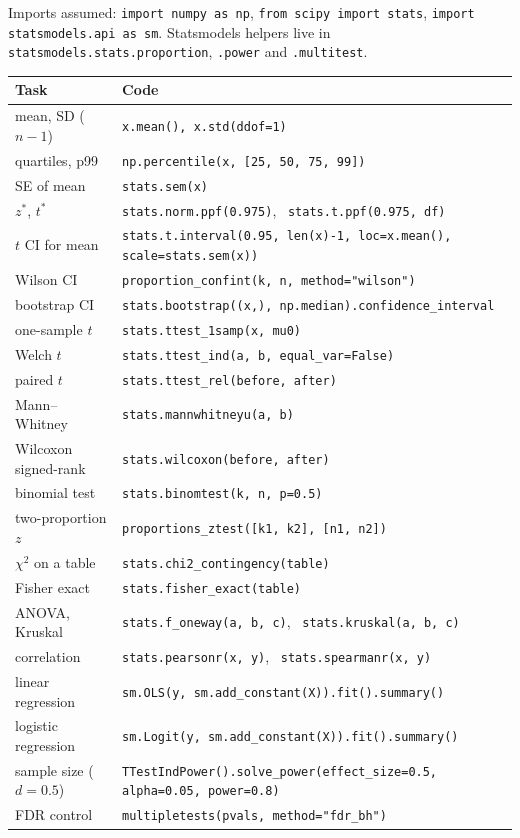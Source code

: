 Imports assumed: \texttt{import numpy as np}, \texttt{from scipy import stats}, \texttt{import statsmodels.api as sm}. Statsmodels helpers live in \texttt{statsmodels.stats.proportion}, \texttt{.power} and \texttt{.multitest}.

\begin{center}
\footnotesize
\renewcommand{\arraystretch}{1.2}
\begin{tabular}{@{}p{3.4cm}p{11.3cm}@{}}
\toprule
Task & Code \\
\midrule
mean, SD ($n-1$) & \texttt{x.mean(), x.std(ddof=1)} \\
quartiles, p99 & \texttt{np.percentile(x, [25, 50, 75, 99])} \\
SE of mean & \texttt{stats.sem(x)} \\
$z^*$, $t^*$ & \texttt{stats.norm.ppf(0.975)}, \ \texttt{stats.t.ppf(0.975, df)} \\
$t$ CI for mean & \texttt{stats.t.interval(0.95, len(x)-1, loc=x.mean(), scale=stats.sem(x))} \\
Wilson CI & \texttt{proportion\_confint(k, n, method="wilson")} \\
bootstrap CI & \texttt{stats.bootstrap((x,), np.median).confidence\_interval} \\
one-sample $t$ & \texttt{stats.ttest\_1samp(x, mu0)} \\
Welch $t$ & \texttt{stats.ttest\_ind(a, b, equal\_var=False)} \\
paired $t$ & \texttt{stats.ttest\_rel(before, after)} \\
Mann--Whitney & \texttt{stats.mannwhitneyu(a, b)} \\
Wilcoxon signed-rank & \texttt{stats.wilcoxon(before, after)} \\
binomial test & \texttt{stats.binomtest(k, n, p=0.5)} \\
two-proportion $z$ & \texttt{proportions\_ztest([k1, k2], [n1, n2])} \\
$\chi^2$ on a table & \texttt{stats.chi2\_contingency(table)} \\
Fisher exact & \texttt{stats.fisher\_exact(table)} \\
ANOVA, Kruskal & \texttt{stats.f\_oneway(a, b, c)}, \ \texttt{stats.kruskal(a, b, c)} \\
correlation & \texttt{stats.pearsonr(x, y)}, \ \texttt{stats.spearmanr(x, y)} \\
linear regression & \texttt{sm.OLS(y, sm.add\_constant(X)).fit().summary()} \\
logistic regression & \texttt{sm.Logit(y, sm.add\_constant(X)).fit().summary()} \\
sample size ($d=0.5$) & \texttt{TTestIndPower().solve\_power(effect\_size=0.5, alpha=0.05, power=0.8)} \\
FDR control & \texttt{multipletests(pvals, method="fdr\_bh")} \\
\bottomrule
\end{tabular}
\end{center}

